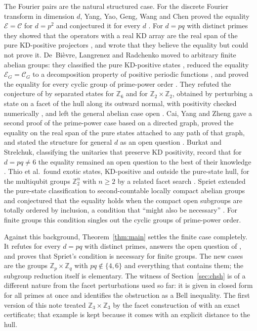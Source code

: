 \documentclass[11pt,a4paper]{article}
\theoremstyle{definition}
\theoremstyle{plain}
\newcommand{\Z}{\mathbb Z}
\newcommand{\E}{\mathcal E}
\newcommand{\hull}{\mathcal C}
\begin{document}
The Fourier pairs are the natural structured case. For the discrete Fourier
transform in dimension $d$, Yang, Yao, Geng, Wang and Chen proved the
equality $\E=\hull$ for $d=p^2$ \cite[Theorem~1]{Yang} and conjectured it for
every $d$ \cite[Conjecture~1]{Yang}. For $d=pq$ with distinct primes they
showed that the operators with a real KD array are the real span of the pure
KD-positive projectors \cite[Lemma~4]{Yang}, and wrote that they believe the
equality but could not prove it. De~Bi\`evre, Langrenez and Radchenko moved
to arbitrary finite abelian groups: they classified the pure KD-positive
states \cite[Theorem~3.1]{DLR}, reduced the equality $\E_G=\hull_G$ to a
decomposition property of positive periodic functions
\cite[Theorem~5.2]{DLR}, and proved the equality for every cyclic group of
prime-power order \cite[Theorem~6.1]{DLR}. They refuted the conjecture of
\cite{Yang} by separated states for $\Z_6$ and for $\Z_2\times\Z_2$, obtained
by perturbing a state on a facet of the hull along its outward normal, with
positivity checked numerically \cite[Section~7]{DLR}, and left the general
abelian case open \cite[Section~8]{DLR}. Cai, Yang and Zheng gave a second
proof of the prime-power case based on a directed graph, proved
the equality on the real span of the pure states attached to any path of
that graph, and stated the structure for general $d$ as an open question
\cite[Theorems~1 and~2, Conclusion]{Cai}. Burkat and Strelchuk, classifying
the unitaries that preserve KD positivity, record that for $d=pq\neq6$ the
equality remained an open question to the best of their knowledge
\cite[Appendix~D]{Burkat}. Thio et al.\ found exotic states, KD-positive
and outside the pure-state hull, for the multiqubit groups $\Z_2^n$ with
$n\geq2$ by a related facet search \cite{Thio}. Spriet extended the pure-state
classification to second-countable locally compact abelian groups and
conjectured that the equality holds when the compact open subgroups are
totally ordered by inclusion, a condition that ``might also be necessary''
\cite[discussion after Eq.~(12)]{Spriet}. For finite groups this condition
singles out the cyclic groups of prime-power order.

Against this background, Theorem~\ref{thm:main} settles the finite case
completely. It refutes \cite[Conjecture~1]{Yang} for every $d=pq$ with
distinct primes, answers the open question of \cite[Section~8]{DLR}, and
proves that Spriet's condition is necessary for finite groups. The new cases
are the groups $\Z_p\times\Z_q$ with $pq\notin\{4,6\}$ and everything that
contains them; the subgroup reduction itself is elementary. The witness of
Section~\ref{sec:chsh} is of a different nature from the facet perturbations
used so far: it is given in closed form for all primes at once and identifies
the obstruction as a Bell inequality. The first version of this note treated
$\Z_3\times\Z_3$ by the facet construction of \cite[Section~7]{DLR} with an
exact certificate; that example is kept because it comes with an explicit
distance to the hull.
\end{document}
